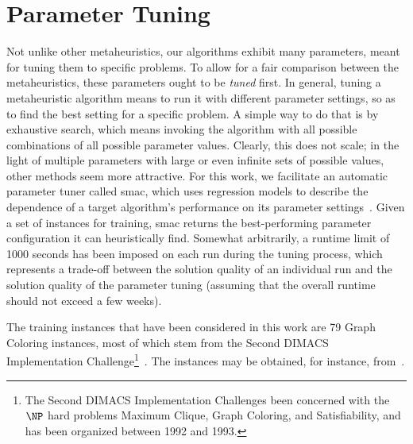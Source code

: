 \documentclass[thesis.tex]{subfiles}
\begin{document}
\chapter{Parameter Tuning}
\label{ch:eval1}

Not unlike other metaheuristics, our algorithms exhibit many parameters, meant for tuning them to specific problems. To allow for a fair comparison between the metaheuristics, these parameters ought to be \emph{tuned} first. In general, tuning a metaheuristic algorithm means to run it with different parameter settings, so as to find the best setting for a specific problem. A simple way to do that is by exhaustive search, which means invoking the algorithm with all possible combinations of all possible parameter values. Clearly, this does not scale; in the light of multiple parameters with large or even infinite sets of possible values, other methods seem more attractive. For this work, we facilitate an automatic parameter tuner called \gls{smac}, which uses regression models to describe the dependence of a target algorithm's performance on its parameter settings~\parencite{smac}.%
Given a set of instances for training, \gls{smac} returns the best-performing parameter configuration it can heuristically find. Somewhat arbitrarily, a runtime limit of 1000 seconds has been imposed on each run during the tuning process, which represents a trade-off between the solution quality of an individual run and the solution quality of the parameter tuning (assuming that the overall runtime should not exceed a few weeks).

The training instances that have been considered in this work are 79 Graph Coloring instances, most of which stem from the Second \gls{DIMACS} Implementation Challenge\footnote{The Second \gls{DIMACS} Implementation Challenges been concerned with the $\NP$ hard problems Maximum Clique, Graph Coloring, and Satisfiability, and has been organized between 1992 and 1993.}~\parencite{dimacs-challenges}. The instances may be obtained, for instance, from~\parencite{graph-coloring-instances}.
\end{document}
